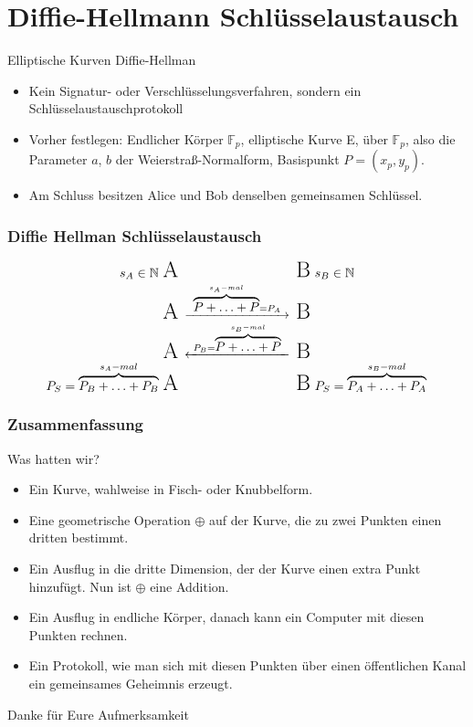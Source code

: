 \documentclass{beamer}
\newcommand{\F}{\mathbb{F}}
\newcommand{\N}{\mathbb{N}}
\begin{document}

\section{Diffie-Hellmann Schlüsselaustausch}

\begin{frame}
  Elliptische Kurven Diffie-Hellman
  \begin{itemize}
  \item Kein Signatur- oder Verschlüsselungsverfahren, sondern ein
    Schlüsselaustauschprotokoll
  \item Vorher festlegen: Endlicher Körper $\F_p$, elliptische Kurve E, über
    $\F_p$, also die Parameter $a$, $b$ der Weierstraß-Normalform, Basispunkt
    $P = (x_p, y_p)$.
  \item Am Schluss besitzen Alice und Bob denselben gemeinsamen Schlüssel.
  \end{itemize}
\end{frame}

\begin{frame}
  \frametitle{Diffie Hellman Schlüsselaustausch}
  \begin{equation*}
    \begin{CD}
      {\hbox to 0pt{\hss $s_A \in \N$ }}\text{\LARGE A}
      @. \text
      {\LARGE B}{\hbox to 0pt{ $s_B \in \N$\hss}} \\
      \text{\LARGE A}
      @>\ \overbrace{P + \ldots + P}^{s_A-mal} = P_A\ >>
      \text{\LARGE B} \\
      \text{\LARGE A}
      @<\ P_B = \overbrace{P + \ldots + P}^{s_B-mal}\ <<
      \text{\LARGE B} \\
      {\hbox to 0pt{\hss $P_S = \overbrace{P_B + \ldots + P_B}^{s_A-mal}$ }}
      \text{\LARGE A}
      @.
      \text{\LARGE B}
      {\hbox to 0pt{ $P_S = \overbrace{P_A + \ldots + P_A}^{s_B-mal}$\hss}}
    \end{CD}
  \end{equation*}
\end{frame}

\begin{frame}
  \frametitle{Zusammenfassung}
  \vspace*{-1cm}
  Was hatten wir?
  \begin{itemize}
  \item Ein Kurve, wahlweise in Fisch- oder Knubbelform.
  \item Eine geometrische Operation $\oplus$ auf der Kurve, die zu zwei
    Punkten einen dritten bestimmt.
  \item Ein Ausflug in die dritte Dimension, der der Kurve einen extra Punkt
    hinzufügt. Nun ist $\oplus$ eine Addition.
  \item Ein Ausflug in endliche Körper, danach kann ein Computer mit diesen
    Punkten rechnen.
  \item Ein Protokoll, wie man sich mit diesen Punkten über einen öffentlichen
    Kanal ein gemeinsames Geheimnis erzeugt.
  \end{itemize}
\end{frame}

\begin{frame}
  \begin{center}
    \Large Danke für Eure Aufmerksamkeit
  \end{center}
\end{frame}
\end{document}
